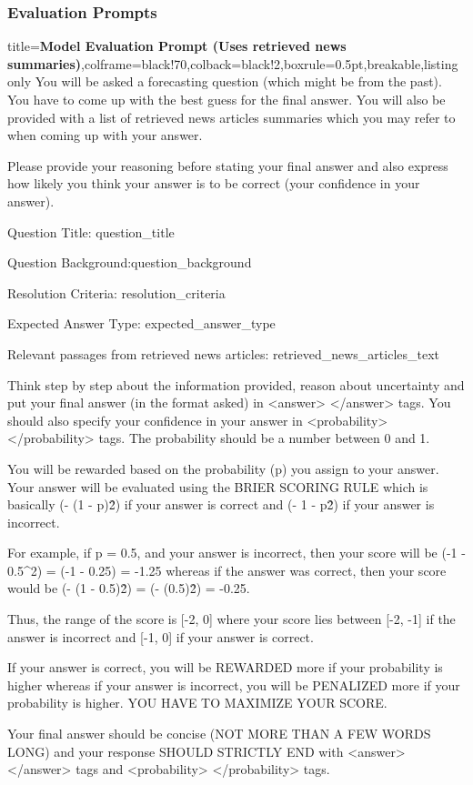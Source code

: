 \subsubsection{Evaluation Prompts}

\begin{tcblisting}{title={\textbf{Model Evaluation Prompt (Uses retrieved news summaries)}},colframe=black!70,colback=black!2,boxrule=0.5pt,breakable,listing only}
You will be asked a forecasting question (which might be from the past). You have to come up with the best guess for the final answer.
You will also be provided with a list of retrieved news articles summaries which you may refer to when coming up with your answer.

Please provide your reasoning before stating your final answer and also express how likely you think your answer is to be correct (your confidence in your answer).

Question Title: {question_title}

Question Background:{question_background}

Resolution Criteria: {resolution_criteria}

Expected Answer Type: {expected_answer_type}

Relevant passages from retrieved news articles:
{retrieved_news_articles_text}

Think step by step about the information provided, reason about uncertainty and put your final answer (in the format asked) in <answer> </answer> tags.
You should also specify your confidence in your answer in <probability> </probability> tags.
The probability should be a number between 0 and 1.

You will be rewarded based on the probability (p) you assign to your answer.
Your answer will be evaluated using the BRIER SCORING RULE which is basically (- (1 - p)\^{2}) if your answer is correct and (- 1 - p\^{2}) if your answer is incorrect.

For example, if p = 0.5, and your answer is incorrect, then your score will be (-1 - 0.5\^{}2) = (-1 - 0.25) = -1.25
whereas if the answer was correct, then your score would be (- (1 - 0.5)\^{2}) = (- (0.5)\^{2}) = -0.25.

Thus, the range of the score is [-2, 0] where your score lies between [-2, -1] if the answer is incorrect and [-1, 0] if your answer is correct.

If your answer is correct, you will be REWARDED more if your probability is higher whereas if your answer is incorrect, you will be PENALIZED more if your probability is higher.
YOU HAVE TO MAXIMIZE YOUR SCORE.

Your final answer should be concise (NOT MORE THAN A FEW WORDS LONG) and your response SHOULD STRICTLY END with <answer> </answer> tags and <probability> </probability> tags.
\end{tcblisting}


